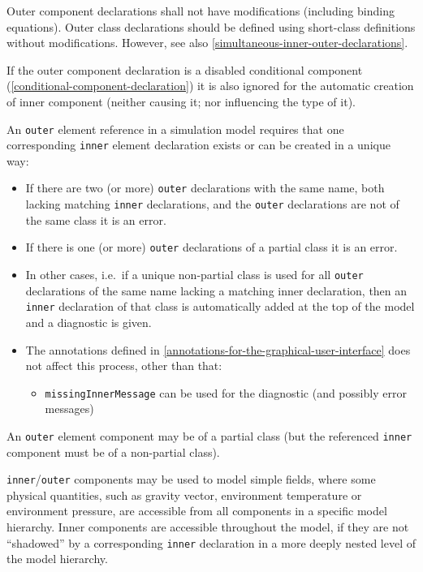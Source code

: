 Outer component declarations shall not have modifications (including binding equations).
Outer class declarations should be defined using short-class definitions without modifications.
However, see also \cref{simultaneous-inner-outer-declarations}.

If the outer component declaration is a disabled conditional component (\cref{conditional-component-declaration}) it is also ignored for the automatic creation of inner component (neither causing it; nor influencing the type of it).

An \lstinline!outer! element reference in a simulation model requires that one corresponding \lstinline!inner! element declaration exists or can be created in a unique way:
\begin{itemize}
\item
  If there are two (or more) \lstinline!outer! declarations with the same name, both lacking matching \lstinline!inner! declarations, and the \lstinline!outer! declarations are not of the same class it is an error.
\item
  If there is one (or more) \lstinline!outer! declarations of a partial class it is an error.
\item
  In other cases, i.e.\ if a unique non-partial class is used for all \lstinline!outer! declarations of the same name lacking a matching inner declaration, then an \lstinline!inner! declaration of that class is automatically added at the top of the model and a diagnostic is given.
\item
  The annotations defined in \cref{annotations-for-the-graphical-user-interface} does not affect this process, other than that:
  \begin{itemize}
  \item
    \lstinline!missingInnerMessage! can be used for the diagnostic (and possibly error messages)
  \end{itemize}
\end{itemize}

An \lstinline!outer! element component may be of a partial class (but the referenced \lstinline!inner! component must be of a non-partial class).

\begin{nonnormative}
\lstinline!inner!/\lstinline!outer! components may be used to model simple fields, where some physical quantities, such as gravity vector, environment temperature or environment pressure, are accessible from all components in a specific model hierarchy.
Inner components are accessible throughout the model, if they are not ``shadowed'' by a corresponding \lstinline!inner! declaration in a more deeply nested level of the model hierarchy.
\end{nonnormative}

